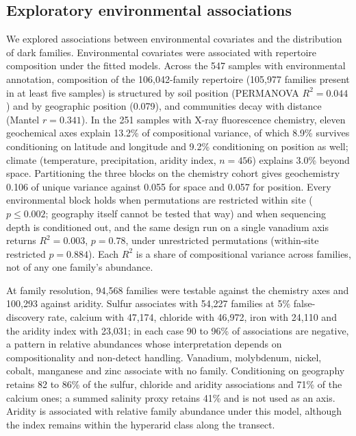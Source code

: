 \documentclass[11pt]{article}
\begin{document}
\subsection*{Exploratory environmental associations}

We explored associations between environmental covariates and the distribution of dark families. Environmental covariates were associated with repertoire composition under the fitted models. Across the 547
samples with environmental annotation, composition of the 106{,}042-family repertoire (105{,}977
families present in at least five samples) is structured by soil position (PERMANOVA $R^2 = 0.044$)
and by geographic position (0.079), and communities decay with distance (Mantel $r = 0.341$). In the
251 samples with X-ray fluorescence chemistry, eleven geochemical axes explain 13.2\% of
compositional variance, of which 8.9\% survives conditioning on latitude and longitude and 9.2\%
conditioning on position as well; climate (temperature, precipitation, aridity index, $n = 456$)
explains 3.0\% beyond space. Partitioning the three blocks on the
chemistry cohort gives geochemistry 0.106 of unique variance against 0.055 for space and 0.057 for
position. Every environmental block holds when permutations are restricted within site
($p \leq 0.002$; geography itself cannot be tested that way) and when sequencing depth is conditioned
out, and the same design run on a single vanadium axis returns $R^2 = 0.003$, $p = 0.78$, under unrestricted permutations (within-site restricted $p = 0.884$). Each $R^2$ is a share of
compositional variance across families, not of any one family's abundance.

At family resolution, 94{,}568 families were testable against the chemistry axes and 100{,}293
against aridity. Sulfur associates with 54{,}227 families at 5\% false-discovery rate, calcium
with 47{,}174, chloride with 46{,}972, iron with 24{,}110 and the aridity index with 23{,}031; in
each case 90 to 96\% of associations are negative, a pattern in relative abundances whose interpretation depends on compositionality and non-detect handling. Vanadium, molybdenum, nickel, cobalt,
manganese and zinc associate with no family. Conditioning on geography retains 82 to 86\% of the
sulfur, chloride and aridity associations and 71\% of the calcium ones; a summed salinity proxy
retains 41\% and is not used as an axis. Aridity is associated with relative family abundance under this model, although the index remains within the hyperarid class along the transect.
\end{document}
